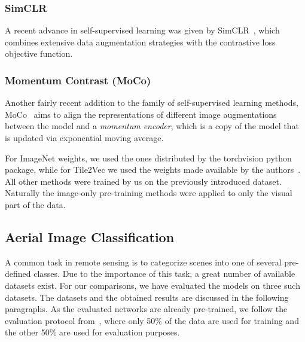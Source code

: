 \documentclass[journal]{IEEEtran}
\begin{document}
\subsubsection{SimCLR}
A recent advance in self-supervised learning was given by SimCLR~\cite{simclr},
which combines extensive data augmentation strategies
with the contrastive loss objective function.
\subsubsection{Momentum Contrast (MoCo)}
Another fairly recent addition to the family of self-supervised learning methods,
MoCo~\cite{he_momentum_2020} aims to align the representations
of different image augmentations between the model and a \emph{momentum encoder},
which is a copy of the model that is updated via exponential moving average.

For ImageNet weights, we used the ones distributed by the torchvision python package,
while for Tile2Vec we used the weights made available by the authors~\cite{tile2vec}.
All other methods were trained by us on the previously introduced dataset.
Naturally the image-only pre-training methods were applied to only the visual part of the data.

\subsection{Aerial Image Classification}
A common task in remote sensing is to categorize scenes into one of several pre-defined classes.
Due to the importance of this task, a great number of available datasets exist.
For our comparisons, we have evaluated the models on three such datasets.
The datasets and the obtained results are discussed in the following paragraphs.
As the evaluated networks are already pre-trained,
we follow the evaluation protocol from~\cite{xia_aid_2017},
where only 50\% of the data are used for training
and the other 50\% are used for evaluation purposes.
\end{document}
